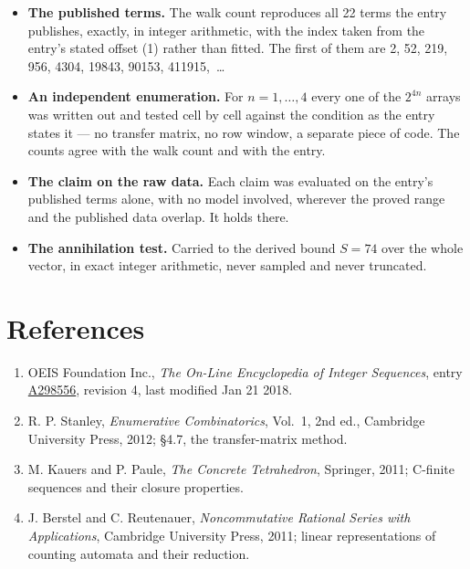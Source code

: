 \documentclass[11pt]{article}
\theoremstyle{definition}
\begin{document}
\begin{itemize}

\item {\bfseries The published terms.} The walk count reproduces all 22 terms the entry publishes, exactly, in integer arithmetic, with the index taken from the entry's stated offset (1) rather than fitted. The first of them are 2, 52, 219, 956, 4304, 19843, 90153, 411915,~\dots

\item {\bfseries An independent enumeration.} For $n = 1,\dots,4$ every one of the $2^{4n}$ arrays was written out and tested cell by cell against the condition as the entry states it --- no transfer matrix, no row window, a separate piece of code. The counts agree with the walk count and with the entry.

\item {\bfseries The claim on the raw data.} Each claim was evaluated on the entry's published terms alone, with no model involved, wherever the proved range and the published data overlap. It holds there.

\item {\bfseries The annihilation test.} Carried to the derived bound $S = 74$ over the whole vector, in exact integer arithmetic, never sampled and never truncated.

\end{itemize}

\section{References}

\begin{enumerate}

\item OEIS Foundation Inc., \emph{The On-Line Encyclopedia of Integer Sequences}, entry \href{https://oeis.org/A298556}{A298556}, revision 4, last modified Jan 21 2018.

\item R. P. Stanley, \emph{Enumerative Combinatorics}, Vol.~1, 2nd ed., Cambridge University Press, 2012; \S4.7, the transfer-matrix method.

\item M. Kauers and P. Paule, \emph{The Concrete Tetrahedron}, Springer, 2011; C-finite sequences and their closure properties.

\item J. Berstel and C. Reutenauer, \emph{Noncommutative Rational Series with Applications}, Cambridge University Press, 2011; linear representations of counting automata and their reduction.

\end{enumerate}
\end{document}
